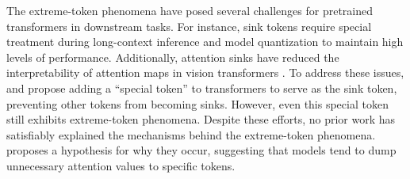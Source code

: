 The extreme-token phenomena have posed several challenges for pretrained transformers in downstream tasks. For instance, sink tokens require special treatment during long-context inference \citep{xiao2023efficient, han2023lm, yu2024unveiling, chen2024image} and model quantization \citep{dettmers2022gpt3, liu2024intactkv, son2024prefixing} to maintain high levels of performance. Additionally, attention sinks have reduced the interpretability of attention maps in vision transformers \citep{darcet2023vision}. To address these issues, \citet{sun2024massive} and \citet{darcet2023vision} propose adding a ``special token'' to transformers to serve as the sink token, preventing other tokens from becoming sinks. However, even this special token still exhibits extreme-token phenomena. Despite these efforts, no prior work has satisfiably explained the mechanisms behind the extreme-token phenomena. \citet{xiao2023efficient} proposes a hypothesis for why they occur, suggesting that models tend to dump unnecessary attention values to specific tokens. 


